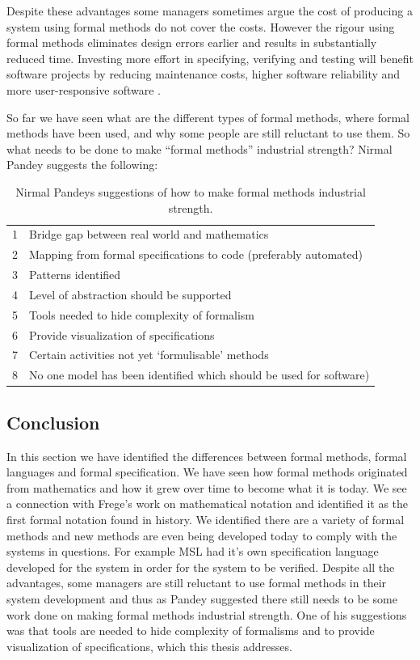 Despite these advantages some managers sometimes argue the cost of producing a
system using formal methods do not cover the costs. However the rigour using
formal methods eliminates design errors earlier and results in substantially
reduced time. Investing more effort in specifying, verifying and testing will
benefit software projects by reducing maintenance costs, higher software
reliability and more user-responsive software \cite{chantatub}.

So far we have seen what are the different types of formal methods, where formal
methods have been used, and why some people are still reluctant to use them. So
what needs to be done to make “formal methods” industrial strength? Nirmal
Pandey \cite{formalmethodslides} suggests the following: 

\begin{table}[H]
\begin{tabular}{|ll|}
\hline
1 & Bridge gap between real world and mathematics \\
2 & Mapping from formal specifications to code (preferably automated) \\
3 &  Patterns identified \\
4 & Level of abstraction should be supported \\
5 &  Tools needed to hide complexity of formalism \\
6 &  Provide visualization of specifications \\
7 & Certain activities not yet ‘formulisable’ methods \\
8 & No one model has been identified which should be used for software) \\
\hline
\end{tabular}
\caption{Nirmal Pandeys suggestions of how to make formal methods industrial strength. \label{tab:nimpand}}
\end{table}


\subsection{Conclusion}

In this section we have identified the differences between formal methods,
formal languages and formal specification. We have seen how formal methods
originated from mathematics and how it grew over time to become what it is
today. We see a connection with Frege's work on mathematical notation and
identified it as the first formal notation found in history. We identified there
are a variety of formal methods and new methods are even being developed today
to comply with the systems in questions. For example MSL had it's own
specification language developed for the system in order for the system to be
verified. Despite all the advantages, some managers are still reluctant to use
formal methods in their system development and thus as Pandey suggested there
still needs to be some work done on making formal methods industrial strength.
One of his suggestions was that tools are needed to hide complexity of
formalisms and to provide visualization of specifications, which this thesis
addresses.


